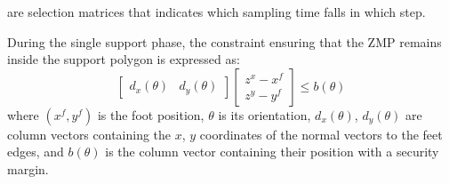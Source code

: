 are selection matrices that indicates which sampling time falls in which step.

During the single support phase, the constraint ensuring that the ZMP remains inside the support polygon is expressed as:
\begin{equation}
  \begin{bmatrix} d_x(\theta) & d_y(\theta) \end{bmatrix}
  \begin{bmatrix} z^x - x^f \\ z^y - y^f \end{bmatrix} \leq b(\theta)
\end{equation}
where $(x^f,y^f)$ is the foot position, $\theta$ is its orientation,
$d_x(\theta)$, $d_y(\theta)$ are column vectors containing the $x$,
$y$ coordinates of the normal vectors to the feet edges, and $b(\theta)$  is the column vector containing their position with a security margin.
